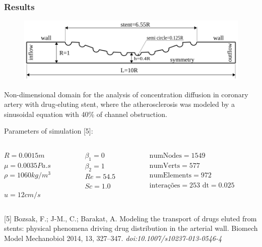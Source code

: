 \begin{frame}
 \frametitle{\LARGE Results}
\begin{figure}
  \vspace{-1cm}
     \centering
      \centering
      \includegraphics[scale=0.5]{images/CurvedStrut.png}\\
\end{figure}
\vspace{-0.5cm}
\begin{center}
\scriptsize 
     Non-dimensional domain for the analysis of concentration diffusion in coronary artery with drug-eluting stent, where the atherosclerosis was modeled by a sinusoidal equation with 40\% of channel obstruction. 
\end{center}
\vspace{0.05cm}
\small
Parameters of simulation [5]:\\[0.3cm]
\begin{center}
\begin{columns}[c]
\hspace{0.5cm}
\begin{column}{0.8\textwidth} 
$R=0.0015m$\\[0.1cm]
$\mu=0.0035Pa.s$\\[0.1cm]
$\rho=1060kg/m^3$\\[0.1cm]\\
$u=12cm/s$
\end{column}
\hspace{-5cm}
\begin{column}{0.3\textwidth}
$\beta_{1}=0$\\[0.1cm]
$\beta_{2}=1$\\[0.1cm]
$Re=54.5$\\[0.1cm]
$Sc=1.0$
\end{column}
\hspace{-1cm}
\begin{column}{0.3\textwidth}
$\text{numNodes}=1549$\\[0.1cm]
$\text{numVerts}=577$\\[0.1cm]
$\text{numElements}=972$\\[0.1cm]
$\text{interações}=253$ \qquad $\text{dt}=0.025$
\end{column}
\end{columns}
\end{center}
\justifying
\tiny [5]
Bozsak, F.; J-M., C.; Barakat, A. Modeling the transport of drugs eluted from stents: physical phenomena driving drug distribution in the arterial wall. Biomech Model Mechanobiol 2014, 13, 327–347.
\textit{doi:10.1007/s10237-013-0546-4}

\end{frame}



